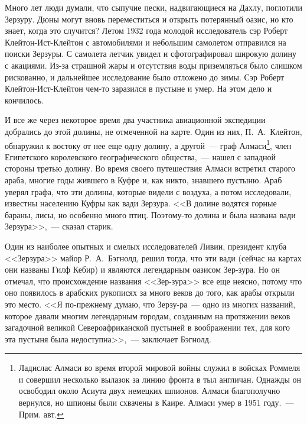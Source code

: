 \documentclass[12pt,a4paper,twoside,openany,svgnames]{memoir}
\begin{document}
Много лет люди думали, что сыпучие пески, надвигающиеся на Дахлу, поглотили Зерзуру. Дюны могут вновь переместиться и открыть потерянный оазис, но кто знает, когда это случится? Летом 1932 года молодой исследователь сэр Роберт Клейтон-Ист-Клейтон с автомобилями и небольшим самолетом отправился на поиски Зерзуры. С самолета летчик увидел и сфотографировал широкую долину с акациями. Из-за страшной жары и отсутствия воды приземляться было слишком рискованно, и дальнейшее исследование было отложено до зимы. Сэр Роберт Клейтон-Ист-Клейтон чем-то заразился в пустыне и умер. На этом дело и кончилось.

И все же через некоторое время два участника авиационной экспедиции добрались до этой долины, не отмеченной на карте. Один из них, П.~А.~Клейтон, обнаружил к востоку от нее еще одну долину, а другой~--- граф Алмаси\footnote{Ладислас Алмаси во время второй мировой войны служил в войсках Роммеля и совершил несколько вылазок за линию фронта в тыл англичан. Однажды он освободил около Асиута двух немецких шпионов. Алмаси благополучно вернулся, но шпионы были схвачены в Каире. Алмаси умер в 1951 году.~--- Прим. авт.}, член Египетского королевского географического общества,~--- нашел с западной стороны третью долину. Во время своего путешествия Алмаси встретил старого араба, многие годы жившего в Куфре и, как никто, знавшего пустыню. Араб уверял графа, что эти долины, которые видели с воздуха, а потом исследовали, известны населению Куфры как вади Зерзура. <<В долине водятся горные бараны, лисы, но особенно много птиц. Поэтому-то долина и была названа вади Зерзура>>,~--- сказал старик.

Один из наиболее опытных и смелых исследователей Ливии, президент клуба <<Зерзура>> майор Р.~А.~Бэгнолд, решил тогда, что эти вади (сейчас на картах они названы Гилф Кебир) и являются легендарным оазисом Зер-зура. Но он отмечал, что происхождение названия <<Зер-зура>> все еще неясно, потому что оно появилось в арабских рукописях за много веков до того, как арабы открыли это место. <<Я по-прежнему думаю, что Зерзу-ра~--- одно из многих названий, которое давали многим легендарным городам, созданным на протяжении веков загадочной великой Североафриканской пустыней в воображении тех, для кого эта пустыня была недоступна>>,~--- заключает Бэгнолд.
\end{document}
